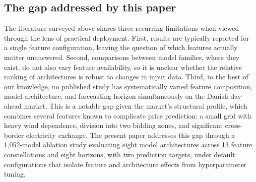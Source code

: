 \subsection{The gap addressed by this paper}
The literature surveyed above shares three recurring limitations when viewed 
through the lens of practical deployment.
First, results are typically reported for a single feature configuration, 
leaving the question of which features actually matter
unanswered. Second, comparisons between model families,
where they exist, do not also vary feature availability, so it is
unclear whether the relative ranking of architectures is robust to
changes in input data. Third, to the best of our knowledge, no
published study has systematically varied feature composition,
model architecture, and forecasting horizon simultaneously on
the Danish day-ahead market. This is a notable gap given the
market's structural profile, which combines several features
known to complicate price prediction: a small grid with
heavy wind dependence, division into two bidding zones,
and significant cross-border electricity exchange. The present
paper addresses this gap through a 1,052-model ablation
study evaluating eight model architectures across 13 feature
constellations and eight horizons, with two prediction targets,
under default configurations that isolate feature and architecture
effects from hyperparameter tuning.
